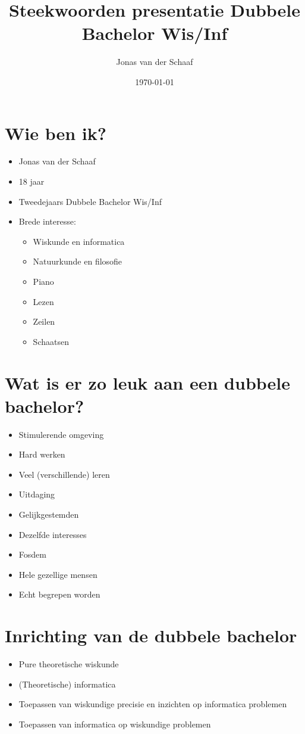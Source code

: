 \documentclass{article}
\title{Steekwoorden presentatie Dubbele Bachelor Wis/Inf}
\author{Jonas van der Schaaf}
\date{\today}
\begin{document}
\maketitle
\section*{Wie ben ik?}
\begin{itemize}
    \item Jonas van der Schaaf
    \item 18 jaar
    \item Tweedejaars Dubbele Bachelor Wis/Inf
    \item Brede interesse:
          \begin{itemize}
              \item Wiskunde en informatica
              \item Natuurkunde en filosofie
              \item Piano
              \item Lezen
              \item Zeilen
              \item Schaatsen
          \end{itemize}
\end{itemize}

\section*{Wat is er zo leuk aan een dubbele bachelor?}
\begin{itemize}
    \item Stimulerende omgeving
    \item Hard werken
    \item Veel (verschillende) leren
    \item Uitdaging
    \item Gelijkgestemden
    \item Dezelfde interesses
    \item Fosdem
    \item Hele gezellige mensen
    \item Echt begrepen worden
\end{itemize}

\section*{Inrichting van de dubbele bachelor}
\begin{itemize}
    \item Pure theoretische wiskunde
    \item (Theoretische) informatica
    \item Toepassen van wiskundige precisie en inzichten op informatica problemen
    \item Toepassen van informatica op wiskundige problemen
\end{itemize}
\end{document}
